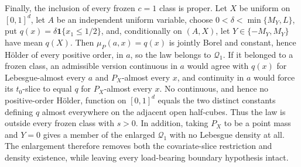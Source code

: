 Finally, the inclusion of every frozen \(c=1\) class is proper. Let \(X\) be uniform on \([0,1]^d\), let \(A\) be an independent uniform variable, choose \(0<\delta<\min\{M_Y,L\}\), put \(q(x)=\delta\mathbf 1\{x_1\le1/2\}\), and, conditionally on \((A,X)\), let \(Y\in\{-M_Y,M_Y\}\) have mean \(q(X)\). Then \(\mu_P(a,x)=q(x)\) is jointly Borel and constant, hence H\"older of every positive order, in \(a\), so the law belongs to \(\mathcal Q_1\). If it belonged to a frozen class, an admissible version continuous in \(a\) would agree with \(q(x)\) for Lebesgue-almost every \(a\) and \(P_X\)-almost every \(x\), and continuity in \(a\) would force its \(t_0\)-slice to equal \(q\) for \(P_X\)-almost every \(x\). No continuous, and hence no positive-order H\"older, function on \([0,1]^d\) equals the two distinct constants defining \(q\) almost everywhere on the adjacent open half-cubes. Thus the law is outside every frozen class with \(s>0\). In addition, taking \(P_X\) to be a point mass and \(Y=0\) gives a member of the enlarged \(\mathcal Q_1\) with no Lebesgue density at all. The enlargement therefore removes both the covariate-slice restriction and density existence, while leaving every load-bearing boundary hypothesis intact.